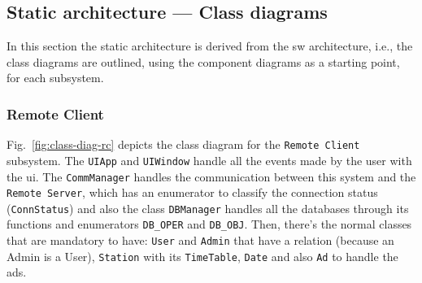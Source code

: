 \subsection{Static architecture --- Class diagrams}
\label{sec:stat-arch-class}
In this section the static architecture is derived from the \gls{sw}
architecture, i.e., the class diagrams are outlined, using the component
diagrams as a starting point, for each subsystem.

\subsubsection{Remote Client}
\label{sec:remote-client-class}
%
Fig.~\ref{fig:class-diag-rc} depicts the class diagram for the \texttt{Remote Client} subsystem.
The \texttt{UIApp} and \texttt{UIWindow} handle all the events made by the user with the \gls{ui}.
The \texttt{CommManager} handles the communication between this system and the \texttt{Remote Server}, which has an enumerator to classify the connection status (\texttt{ConnStatus}) and also the class \texttt{DBManager} handles all the databases through its functions and enumerators \texttt{DB\_OPER} and \texttt{DB\_OBJ}.
Then, there's the normal classes that are mandatory to have: \texttt{User} and \texttt{Admin} that have a relation (because an Admin is a User), \texttt{Station} with its \texttt{TimeTable}, \texttt{Date} and also \texttt{Ad} to handle the ads.

